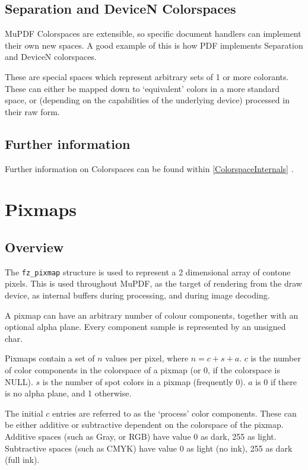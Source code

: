 \documentclass[oneside]{book}
\newcommand{\rjwref}[1] {\autoref{#1} \nameref{#1}}
\begin{document}
\subsection{Separation and DeviceN Colorspaces}

MuPDF Colorspaces are extensible, so specific document handlers can implement their own new spaces. A good example of this is how PDF implements Separation and DeviceN colorspaces.

These are special spaces which represent arbitrary sets of 1 or more colorants. These can either be mapped down to `equivalent' colors in a more standard space, or (depending on the capabilities of the underlying device) processed in their raw form. 

\subsection{Further information}

Further information on Colorspaces can be found within \rjwref{ColorspaceInternals}.

\section{Pixmaps}
\label{Pixmaps}

\subsection{Overview}

The \texttt{fz\_pixmap} structure is used to represent a 2 dimensional array of contone pixels. This is used throughout MuPDF, as the target of rendering from the draw device, as internal buffers during processing, and during image decoding.

A pixmap can have an arbitrary number of colour components, together with an optional alpha plane. Every component sample is represented by an unsigned char.

Pixmaps contain a set of $n$ values per pixel, where $n = c + s + a$. $c$ is the number of color components in the colorspace of a pixmap (or 0, if the colorspace is NULL). $s$ is the number of spot colors in a pixmap (frequently 0). $a$ is 0 if there is no alpha plane, and 1 otherwise.

The initial $c$ entries are referred to as the `process' color components. These can be either additive or subtractive dependent on the colorspace of the pixmap. Additive spaces (such as Gray, or RGB) have value 0 as dark, 255 as light. Subtractive spaces (such as CMYK) have value 0 as light (no ink), 255 as dark (full ink).
\end{document}
